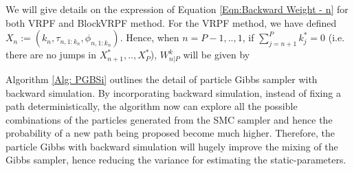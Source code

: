 \documentclass[12pt,a4paper]{article}
\begin{document}
We will give details on the expression of Equation \eqref{Eqn:Backward Weight - n} for both VRPF and BlockVRPF method. For the VRPF method, we have defined $X_n := \left(k_n,\tau_{n,1:k_n},\phi_{n,1:k_n}\right)$. Hence, when $n = P-1, .., 1$, if $\sum_{j=n+1}^{P} k_j^{*} = 0$ (i.e. there are no jumps in $X_{n+1}^{*},..,X_{P}^{*}$), $W_{n|P}^k$ will be given by

Algorithm \ref{Alg: PGBSi} outlines the detail of particle Gibbs sampler with backward simulation. By incorporating backward simulation, instead of fixing a path deterministically, the algorithm now can explore all the possible combinations of the particles generated from the SMC sampler and hence the probability of a new path being proposed become much higher. Therefore, the particle Gibbs with backward simulation will hugely improve the mixing of the Gibbs sampler, hence reducing the variance for estimating the static-parameters. 
\end{document}
